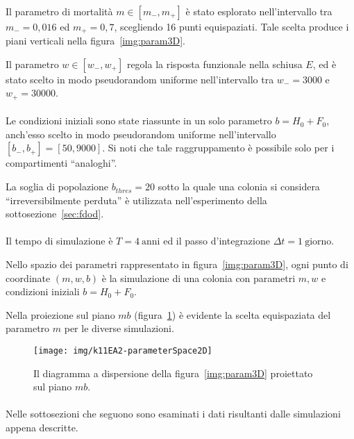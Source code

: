 \paragraph{}
Il parametro di mortalità $m \in \left[ m_-, m_+ \right]$ è stato esplorato nell'intervallo tra $m_- = 0,016$ ed
$m_+ = 0,7$, scegliendo 16 punti equispaziati. Tale scelta produce i piani verticali nella figura~\ref{img:param3D}.

Il parametro $w \in \left[ w_-, w_+ \right]$ regola la risposta funzionale nella schiusa $E$, ed è
stato scelto in modo pseudorandom uniforme nell'intervallo tra $w_- = 3000$ e $w_+ = 30000$.

\paragraph{}
Le condizioni iniziali sono state riassunte in un solo parametro $b = H_0 +F_0$, anch'esso scelto
in modo pseudorandom uniforme nell'intervallo $\left[ b_-, b_+ \right] = \left[50, 9000\right]$.
Si noti che tale raggruppamento è possibile solo per i compartimenti ``analoghi''.

La soglia di popolazione $b_{thres} = 20$ sotto la quale una colonia si considera ``irreversibilmente perduta''
è utilizzata nell'esperimento della sottosezione~\ref{sec:fdod}.

\paragraph{}
Il tempo di simulazione è $T=4~\text{anni}$ ed il passo d'integrazione $\Delta t = 1~\text{giorno}$.

Nello spazio dei parametri rappresentato in figura~\ref{img:param3D}, ogni punto di coordinate $(m,w,b)$
è la simulazione di una colonia con parametri $m,w$ e condizioni iniziali $b=H_0+F_0$.

Nella proiezione sul piano $mb$ (figura~\ref{img:param2D}) è evidente la scelta equispaziata del parametro $m$ per
le diverse simulazioni.
\begin{figure}[hb]
    \centering
    \texttt{[image: img/k11EA2-parameterSpace2D]}

    \caption[Esperimento A2, proiezione dello spazio dei parametri.]{Il diagramma a dispersione della
        figura~\ref{img:param3D} proiettato sul piano $mb$.}
    \label{img:param2D}
\end{figure}

\paragraph{}
Nelle sottosezioni che seguono sono esaminati i dati risultanti dalle simulazioni appena descritte.

